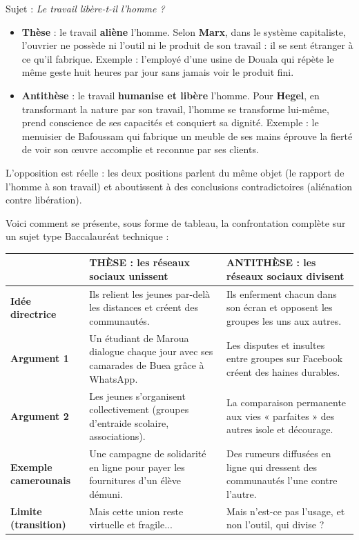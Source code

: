 \documentclass[11pt]{article}
\begin{document}
\begin{exemplebox}
Sujet : \emph{Le travail libère-t-il l'homme ?}
\begin{itemize}
\item \textbf{Thèse} : le travail \textbf{aliène} l'homme. Selon \textbf{Marx}, dans le système capitaliste, l'ouvrier ne possède ni l'outil ni le produit de son travail : il se sent étranger à ce qu'il fabrique. Exemple : l'employé d'une usine de Douala qui répète le même geste huit heures par jour sans jamais voir le produit fini.
\item \textbf{Antithèse} : le travail \textbf{humanise et libère} l'homme. Pour \textbf{Hegel}, en transformant la nature par son travail, l'homme se transforme lui-même, prend conscience de ses capacités et conquiert sa dignité. Exemple : le menuisier de Bafoussam qui fabrique un meuble de ses mains éprouve la fierté de voir son œuvre accomplie et reconnue par ses clients.
\end{itemize}
L'opposition est réelle : les deux positions parlent du même objet (le rapport de l'homme à son travail) et aboutissent à des conclusions contradictoires (aliénation contre libération).
\end{exemplebox}

Voici comment se présente, sous forme de tableau, la confrontation complète sur un sujet type Baccalauréat technique :

\begin{center}
\begin{tabularx}{\linewidth}{|l|X|X|}
\hline
\rowcolor{popblueL} & \textbf{THÈSE : les réseaux sociaux unissent} & \textbf{ANTITHÈSE : les réseaux sociaux divisent} \\
\hline
\textbf{Idée directrice} & Ils relient les jeunes par-delà les distances et créent des communautés. & Ils enferment chacun dans son écran et opposent les groupes les uns aux autres. \\
\hline
\textbf{Argument 1} & Un étudiant de Maroua dialogue chaque jour avec ses camarades de Buea grâce à WhatsApp. & Les disputes et insultes entre groupes sur Facebook créent des haines durables. \\
\hline
\textbf{Argument 2} & Les jeunes s'organisent collectivement (groupes d'entraide scolaire, associations). & La comparaison permanente aux vies « parfaites » des autres isole et décourage. \\
\hline
\textbf{Exemple camerounais} & Une campagne de solidarité en ligne pour payer les fournitures d'un élève démuni. & Des rumeurs diffusées en ligne qui dressent des communautés l'une contre l'autre. \\
\hline
\textbf{Limite (transition)} & Mais cette union reste virtuelle et fragile... & Mais n'est-ce pas l'usage, et non l'outil, qui divise ? \\
\hline
\end{tabularx}
\end{center}
\end{document}
